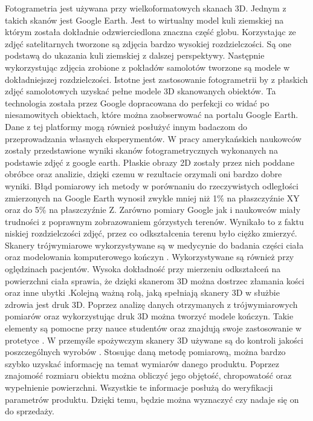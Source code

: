 Fotogrametria jest używana przy wielkoformatowych skanach 3D. Jednym z takich skanów jest Google Earth. Jest to wirtualny model kuli ziemskiej na którym została dokładnie odzwierciedlona znaczna część globu. Korzystając ze zdjęć satelitarnych tworzone są zdjęcia bardzo wysokiej rozdzielczości. Są one podstawą do ukazania kuli ziemskiej z dalszej perspektywy. Następnie wykorzystując zdjęcia zrobione z pokładów samolotów tworzone są modele w dokładniejszej rozdzielczości. Istotne jest zastosowanie fotogrametrii by z płaskich zdjęć samolotowych uzyskać pełne modele 3D skanowanych obiektów. Ta technologia została przez Google dopracowana do perfekcji co widać po niesamowitych obiektach, które można zaobserwować na portalu Google Earth. Dane z tej platformy mogą również posłużyć innym badaczom do przeprowadzania własnych eksperymentów. W pracy amerykańskich naukowców \cite{inproceedings} zostały przedstawione wyniki skanów fotogrametrycznych wykonanych na podstawie zdjęć z google earth. Płaskie obrazy 2D zostały przez nich poddane obróbce oraz analizie, dzięki czemu w rezultacie orzymali oni bardzo dobre wyniki. Błąd pomiarowy ich metody w porównaniu do rzeczywistych odległości zmierzonych na Google Earth wynosił zwykle mniej niż 1\% na płaszczyźnie XY oraz do 5\% na płaszczyźnie Z. Zarówno pomiary Google jak i naukowców miały trudności z poprawnym zobrazowaniem górzystych terenów. Wynikało to z faktu niskiej rozdzielczości zdjęć, przez co odkształcenia terenu było ciężko zmierzyć. 
\newline \indent Skanery trójwymiarowe wykorzystywane są w medycynie do badania części ciała oraz modelowania komputerowego kończyn \cite{tomaka20053d}. Wykorzystywane są również przy oględzinach pacjentów. Wysoka dokładność przy mierzeniu odkształceń na powierzchni ciała sprawia, że dzięki skanerom 3D można dostrzec złamania kości oraz inne ubytki \cite{thali2003optical}.Kolejną ważną rolą, jaką spełniają skanery 3D w służbie zdrowia jest druk 3D. Poprzez analizę danych otrzymanych z trójwymiarowych pomiarów oraz wykorzystując druk 3D można tworzyć modele kończyn. Takie elementy są pomocne przy nauce studentów oraz znajdują swoje zastosowanie w protetyce \cite{mcmenamin2014production}. 
\newline \indent W przemyśle spożywczym skanery 3D używane są do kontroli jakości poszczególnych wyrobów \cite{anders2012zastosowanie}. Stosując daną metodę pomiarową, można bardzo szybko uzyskać informację na temat wymiarów danego produktu. Poprzez znajomość rozmiaru obiektu można obliczyć jego objętość, chropowatość oraz wypełnienie powierzchni. Wszystkie te informacje posłużą do weryfikacji parametrów produktu. Dzięki temu, będzie można wyznaczyć czy nadaje się on do sprzedaży.
